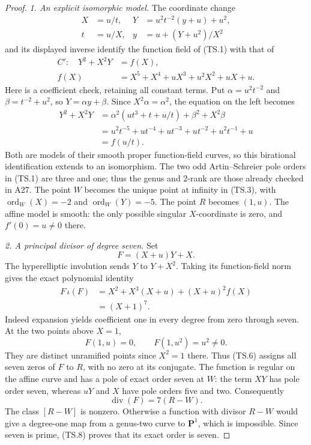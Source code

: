 \begin{proof}
\emph{1. An explicit isomorphic model.}
The coordinate change
\[
 \begin{aligned}
 X&=u/t, &
 Y&=u^2t^{-2}(y+u)+u^2,\\
 t&=u/X, &
 y&=u+(Y+u^2)/X^2
 \end{aligned}
 \tag{TS.2}
\]
and its displayed inverse identify the function field of (TS.1)
with that of
\[
 \begin{aligned}
 C':\quad Y^2+X^2Y&=f(X),\\
 f(X)&=X^5+X^4+uX^3+u^2X^2+uX+u.
 \end{aligned}
 \tag{TS.3}
\]
Here is a coefficient check, retaining all constant terms.
Put $\alpha=u^2t^{-2}$ and $\beta=t^{-2}+u^2$, so
$Y=\alpha y+\beta$.  Since $X^2\alpha=\alpha^2$,
the equation on the left becomes
\[
 \begin{aligned}
 Y^2+X^2Y
 &=\alpha^2(ut^3+t+u/t)+\beta^2+X^2\beta\\
 &=u^2t^{-5}+ut^{-4}+ut^{-3}
       +ut^{-2}+u^2t^{-1}+u\\
 &=f(u/t).
 \end{aligned}
 \tag{TS.4}
\]
Both are models of their smooth proper function-field curves, so
this birational identification extends to an isomorphism.
The two odd Artin--Schreier pole orders in (TS.1) are three and
one; thus the genus and $2$-rank are those already checked in A27.
The point $W$ becomes the unique point at infinity in (TS.3),
with $\operatorname{ord}_W(X)=-2$ and
$\operatorname{ord}_W(Y)=-5$.  The point $R$ becomes $(1,u)$.
The affine model is smooth: the only possible singular
$X$-coordinate is zero, and $f'(0)=u\ne0$ there.

\emph{2. A principal divisor of degree seven.}
Set
\[
                F=(X+u)Y+X.
 \tag{TS.5}
\]
The hyperelliptic involution sends $Y$ to $Y+X^2$.
Taking its function-field norm gives the exact polynomial identity
\[
 \begin{aligned}
 F\,\iota(F)
 &=X^2+X^3(X+u)+(X+u)^2f(X)\\
 &=(X+1)^7.
 \end{aligned}
 \tag{TS.6}
\]
Indeed expansion yields coefficient one in every degree from
zero through seven.  At the two points above $X=1$,
\[
       F(1,u)=0,\qquad F(1,u^2)=u^2\ne0.
 \tag{TS.7}
\]
They are distinct unramified points since $X^2=1$ there.
Thus (TS.6) assigns all seven zeros of $F$ to $R$, with no
zero at its conjugate.  The function is regular on the affine
curve and has a pole of exact order seven at $W$:
the term $XY$ has pole order seven, whereas $uY$ and $X$
have pole orders five and two.  Consequently
\[
                       \operatorname{div}(F)=7(R-W).
 \tag{TS.8}
\]
The class $[R-W]$ is nonzero.  Otherwise a function with divisor
$R-W$ would give a degree-one map from a genus-two curve to
$\mathbf P^1$, which is impossible.  Since seven is prime,
(TS.8) proves that its exact order is seven.


\end{proof}
